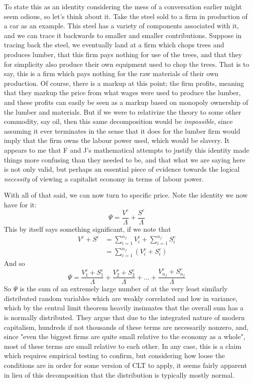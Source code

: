 \documentclass{article}
\theoremstyle{definition}
\theoremstyle{plain}
\theoremstyle{theorem}
\begin{document}
To state this as an identity considering the mess of a conversation earlier might seem odious, so let's think about it. Take the steel sold to a firm in production of a car as an example. This steel has a variety of components associated with it, and we can trace it backwards to smaller and smaller contributions. Suppose in tracing back the steel, we eventually land at a firm which chops trees and produces lumber, that this firm pays nothing for use of the trees, and that they for simplicity also produce their own equipment used to chop the trees. That is to say, this is a firm which pays nothing for the raw materials of their own production. Of course, there is a markup at this point; the firm profits, meaning that they markup the price from what wages were used to produce the lumber, and these profits can easily be seen as a markup based on monopoly ownership of the lumber and materials. But if we were to relativize the theory to some other commodity, say oil, then this same decomposition would be \textit{impossible}, since assuming it ever terminates in the sense that it does for the lumber firm would imply that the firm owns the labour power used, which would be slavery. It appears to me that F and J's mathematical attempts to justify this identity made things more confusing than they needed to be, and that what we are saying here is not only valid, but perhaps an essential piece of evidence towards the logical \textit{necessity} of viewing a capitalist economy in terms of labour power. \par 
With all of that said, we can now turn to specific price. Note the identity we now have for it:
\[ \Psi = \frac{V^c}{\Lambda} + \frac{S^c}{\Lambda} \]
This by itself says something significant, if we note that
\begin{align}
	 V^c + S^c &= \sum_{i=1}^{n_f} V^c_i + \sum_{i=1}^{n_f} S^c_i \\
	 		   &= \sum_{i=1}^{n_f} (V^c_i + S^c_i)
\end{align}
And so 
\[ \Psi = \frac{V^c_1+S^c_1}{\Lambda} + \frac{V^c_2+S^c_2}{\Lambda} + \ldots + \frac{V^c_{n_f}+S^c_{n_f}}{\Lambda} \]
So $\Psi$ is the sum of an extremely large number of at the very least similarly distributed random variables which are weakly correlated and low in variance, which by the central limit theorem heavily insinuates that the overall sum has a is normally distributed. They argue that due to the integrated nature of modern capitalism, hundreds if not thousands of these terms are necessarily nonzero, and, since "even the biggest firms are quite small relative to the economy as a whole", most of these terms are small relative to each other. In any case, this is a claim which requires empirical testing to confirm, but considering how loose the conditions are in order for some version of CLT to apply, it seems fairly apparent in lieu of this decomposition that the distribution is typically mostly normal. \par 
\end{document}
